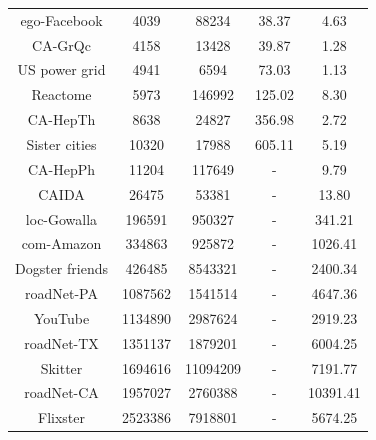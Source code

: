 \documentclass[sigconf]{acmart}
\begin{document}
\begin{table}
\begin{tabular}{ccccc}
        ego-Facebook           & 4039                 & 88234                & 38.37                              & 4.63            \\
        CA-GrQc                & 4158                 & 13428                & 39.87                              & 1.28            \\
        US power grid          & 4941                 & 6594                 & 73.03                              & 1.13            \\
        Reactome               & 5973                 & 146992               & 125.02                             & 8.30            \\
        CA-HepTh               & 8638                 & 24827                & 356.98                             & 2.72            \\
        Sister cities          & 10320                & 17988                & 605.11                             & 5.19            \\
        CA-HepPh               & 11204                & 117649               & -                                  & 9.79            \\
        CAIDA                  & 26475                & 53381                & -                                  & 13.80           \\
        loc-Gowalla            & 196591               & 950327               & -                                  & 341.21          \\
        com-Amazon             & 334863               & 925872               & -                                  & 1026.41         \\
        Dogster friends        & 426485               & 8543321              & -                                  & 2400.34         \\
        roadNet-PA             & 1087562              & 1541514              & -                                  & 4647.36         \\
        YouTube                & 1134890              & 2987624              & -                                  & 2919.23         \\
        roadNet-TX             & 1351137              & 1879201              & -                                  & 6004.25         \\
        Skitter                & 1694616              & 11094209             & -                                  & 7191.77         \\
        roadNet-CA             & 1957027              & 2760388              & -                                  & 10391.41        \\
        Flixster               & 2523386              & 7918801              & -                                  & 5674.25         \\
        \bottomrule
    \end{tabular}
\end{table}
\end{document}
